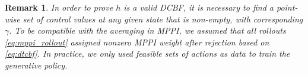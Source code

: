 \documentclass[letterpaper, 10 pt, conference]{ieeeconf}
\newtheorem{remark}{Remark}
\begin{document}
%

\begin{remark} In order to prove $h$ is a valid DCBF, it is necessary to find a point-wise set of control values at any given state that is non-empty, with corresponding $\gamma$. To be compatible with the averaging in MPPI, we assumed that all rollouts \eqref{eq:mppi_rollout} assigned nonzero MPPI weight after rejection based on \eqref{eq:dtcbf}. In practice, we only used feasible sets of actions as data to train the generative policy.
\end{remark}
\end{document}
